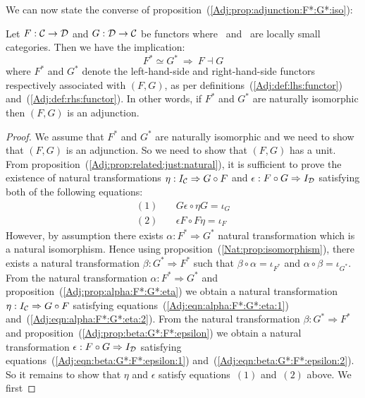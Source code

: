 \noindent
We can now state the converse of proposition~(\ref{Adj:prop:adjunction:F*:G*:iso}):
\begin{prop}\label{Adj:prop:F*:G*:iso:adjunction}
    Let $F:\mbox{$\cal C$}\to\mbox{$\cal D$}$ and $G:\mbox{$\cal D$}\to\mbox{$\cal C$}$ be functors where \Cat\ and \Dat\ 
    are locally small categories. Then we have the implication:
        \[
            F^{*}\simeq G^{*}\ \Rightarrow\ F\dashv G
        \]
    where $F^{*}$ and $G^{*}$ denote the left-hand-side and right-hand-side 
    functors respectively associated with $(F,G)$, as per 
    definitions~(\ref{Adj:def:lhs:functor}) and~(\ref{Adj:def:rhs:functor}). 
    In other words, if $F^{*}$ and $G^{*}$ are 
    naturally isomorphic then $(F,G)$ is an adjunction.
\end{prop}
\begin{proof}
    We assume that $F^{*}$ and $G^{*}$ are naturally isomorphic and we need
    to show that $(F,G)$ is an adjunction. So we need to show that $(F,G)$ has
    a unit. From proposition~(\ref{Adj:prop:related:just:natural}), it is
    sufficient to prove the existence of natural transformations
    $\eta:I_{\cal C}\Rightarrow G\circ F$ and 
    $\epsilon:F\circ G\Rightarrow I_{\cal D}$ satisfying both of the 
    following equations:
        \begin{eqnarray*}
            (1)&\ &G\epsilon\circ\eta G=\iota_{G}\\
            (2)&\ &\epsilon F \circ F\eta=\iota_{F}
        \end{eqnarray*}
    However, by assumption there exists $\alpha:F^{*}\Rightarrow G^{*}$ 
    natural transformation which is a natural isomorphism. Hence using
    proposition~(\ref{Nat:prop:isomorphism}), there exists a natural
    transformation $\beta:G^{*}\Rightarrow F^{*}$ such that
    $\beta\circ\alpha=\iota_{F^{*}}$ and $\alpha\circ\beta=\iota_{G^{*}}$.
    From the natural transformation $\alpha:F^{*}\Rightarrow G^{*}$ and
    proposition~(\ref{Adj:prop:alpha:F*:G*:eta}) we obtain a natural 
    transformation $\eta:I_{\cal C}\Rightarrow G\circ F$ satisfying 
    equations~(\ref{Adj:eqn:alpha:F*:G*:eta:1}) 
    and~(\ref{Adj:eqn:alpha:F*:G*:eta:2}). From the natural
    transformation $\beta:G^{*}\Rightarrow F^{*}$ and 
    proposition~(\ref{Adj:prop:beta:G*:F*:epsilon}) we obtain a natural
    transformation $\epsilon:F\circ G\Rightarrow I_{\cal D}$ satisfying
    equations~(\ref{Adj:eqn:beta:G*:F*:epsilon:1})
    and~(\ref{Adj:eqn:beta:G*:F*:epsilon:2}). So it remains to show that
    $\eta$ and $\epsilon$ satisfy equations~$(1)$ and~$(2)$ above. We first

\end{proof}
